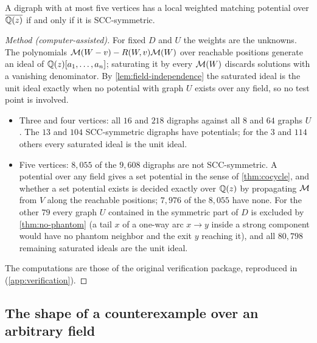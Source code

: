 \begin{theorem}\label{thm:exact5}
A digraph with at most five vertices has a local weighted matching potential over $\overline{\mathbb{Q}(z)}$ if and only if it is SCC-symmetric.
\end{theorem}
\begin{proof}[Method \textup{(computer-assisted)}]
For fixed $D$ and $U$ the weights are the unknowns. The polynomials $\mathcal{M}(W-v)-R(W,v)\mathcal{M}(W)$ over reachable positions generate an ideal of $\mathbb{Q}(z)[a_1,\dots,a_n]$; saturating it by every $\mathcal{M}(W)$ discards solutions with a vanishing denominator. By \cref{lem:field-independence} the saturated ideal is the unit ideal exactly when no potential with graph $U$ exists over any field, so no test point is involved.
\begin{itemize}
\item Three and four vertices: all $16$ and $218$ digraphs against all $8$ and $64$ graphs $U$. The $13$ and $104$ SCC-symmetric digraphs have potentials; for the $3$ and $114$ others every saturated ideal is the unit ideal.
\item Five vertices: $8{,}055$ of the $9{,}608$ digraphs are not SCC-symmetric. A potential over any field gives a set potential in the sense of \cref{thm:cocycle}, and whether a set potential exists is decided exactly over $\mathbb{Q}(z)$ by propagating $\mathcal{M}$ from $V$ along the reachable positions; $7{,}976$ of the $8{,}055$ have none. For the other $79$ every graph $U$ contained in the symmetric part of $D$ is excluded by \cref{thm:no-phantom} (a tail $x$ of a one-way arc $x\to y$ inside a strong component would have no phantom neighbor and the exit $y$ reaching it), and all $80{,}798$ remaining saturated ideals are the unit ideal.
\end{itemize}
The computations are those of the original verification package, reproduced in  (\cref{app:verification}).
\end{proof}

\subsection{The shape of a counterexample over an arbitrary field}

